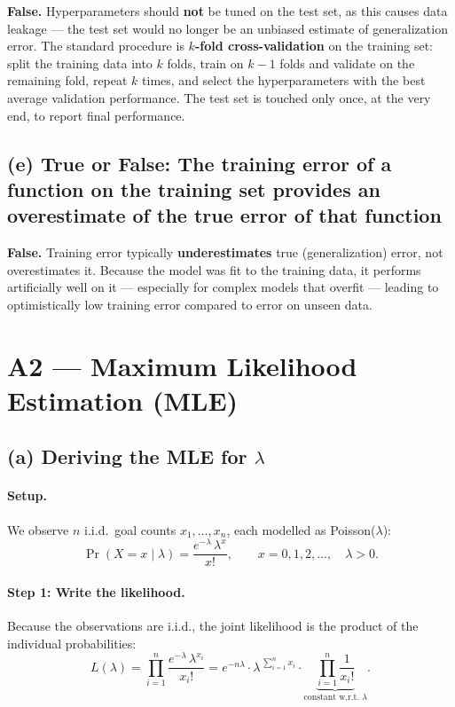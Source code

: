 \documentclass{article}
\begin{document}
\textbf{False.} Hyperparameters should \textbf{not} be tuned on the test set, as this causes data leakage --- the test set would no longer be an unbiased estimate of generalization error. The standard procedure is \textbf{$k$-fold cross-validation} on the training set: split the training data into $k$ folds, train on $k{-}1$ folds and validate on the remaining fold, repeat $k$ times, and select the hyperparameters with the best average validation performance. The test set is touched only once, at the very end, to report final performance.

\subsection*{(e) True or False: The training error of a function on the training set provides an overestimate of the true error of that function}

\textbf{False.} Training error typically \textbf{underestimates} true (generalization) error, not overestimates it. Because the model was fit to the training data, it performs artificially well on it --- especially for complex models that overfit --- leading to optimistically low training error compared to error on unseen data.


\section*{A2 --- Maximum Likelihood Estimation (MLE)}

\subsection*{(a) Deriving the MLE for $\lambda$}

\paragraph{Setup.}
We observe $n$ i.i.d.\ goal counts $x_1, \ldots, x_n$, each modelled as Poisson($\lambda$):
\[
  \Pr(X = x \mid \lambda) = \frac{e^{-\lambda}\,\lambda^{x}}{x!}, \qquad x = 0,1,2,\ldots, \quad \lambda > 0.
\]

\paragraph{Step 1: Write the likelihood.}
Because the observations are i.i.d., the joint likelihood is the product of the individual probabilities:
\[
  L(\lambda)
  = \prod_{i=1}^{n} \frac{e^{-\lambda}\,\lambda^{x_i}}{x_i!}
  = e^{-n\lambda}
    \cdot \lambda^{\,\sum_{i=1}^{n} x_i}
    \cdot \underbrace{\prod_{i=1}^{n} \frac{1}{x_i!}}_{\text{constant w.r.t.\ }\lambda}.
\]
\end{document}
